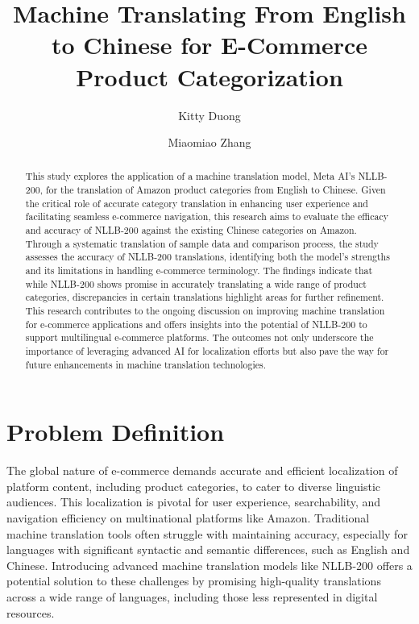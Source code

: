 \documentclass[sigconf]{acmart}
\begin{document}
\title{Machine Translating From English to Chinese for E-Commerce Product Categorization}

\author{Kitty Duong}

\author{Miaomiao Zhang}

\begin{abstract}
This study explores the application of a machine translation model, Meta AI's NLLB-200, for the translation of Amazon product categories from English to Chinese. Given the critical role of accurate category translation in enhancing user experience and facilitating seamless e-commerce navigation, this research aims to evaluate the efficacy and accuracy of NLLB-200 against the existing Chinese categories on Amazon. Through a systematic translation of sample data and comparison process, the study assesses the accuracy of NLLB-200 translations, identifying both the model's strengths and its limitations in handling e-commerce terminology. The findings indicate that while NLLB-200 shows promise in accurately translating a wide range of product categories, discrepancies in certain translations highlight areas for further refinement. This research contributes to the ongoing discussion on improving machine translation for e-commerce applications and offers insights into the potential of NLLB-200 to support multilingual e-commerce platforms. The outcomes not only underscore the importance of leveraging advanced AI for localization efforts but also pave the way for future enhancements in machine translation technologies.

\end{abstract}

\maketitle


\section{Problem Definition}
The global nature of e-commerce demands accurate and efficient localization of platform content, including product categories, to cater to diverse linguistic audiences. This localization is pivotal for user experience, searchability, and navigation efficiency on multinational platforms like Amazon. Traditional machine translation tools often struggle with maintaining accuracy, especially for languages with significant syntactic and semantic differences, such as English and Chinese. Introducing advanced machine translation models like NLLB-200 offers a potential solution to these challenges by promising high-quality translations across a wide range of languages, including those less represented in digital resources.
\end{document}
